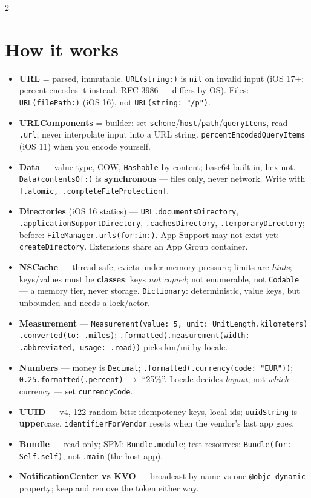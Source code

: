 \documentclass[8pt]{extarticle}
\begin{document}
\begin{multicols}{2}
\raggedright

\section{How it works}
\begin{itemize}
  \item \textbf{URL} = parsed, immutable. \texttt{URL(string:)} is \texttt{nil} on invalid
        input (iOS 17+: percent-encodes it instead, RFC 3986 — differs by OS). Files:
        \texttt{URL(filePath:)} (iOS 16), not \texttt{URL(string: "/p")}.
  \item \textbf{URLComponents} = builder: set \texttt{scheme}/\texttt{host}/\texttt{path}/\texttt{queryItems},
        read \texttt{.url}; never interpolate input into a URL string.
        \texttt{percentEncodedQueryItems} (iOS 11) when you encode yourself.
  \item \textbf{Data} — value type, COW, \texttt{Hashable} by content; base64 built in, hex
        not. \texttt{Data(contentsOf:)} is \textbf{synchronous} — files only, never network.
        Write with \texttt{[.atomic, .completeFileProtection]}.
  \item \textbf{Directories} (iOS 16 statics) — \texttt{URL.documentsDirectory},
        \texttt{.applicationSupportDirectory}, \texttt{.cachesDirectory},
        \texttt{.temporaryDirectory}; before: \texttt{FileManager.urls(for:in:)}.
        App Support may not exist yet: \texttt{createDirectory}. Extensions share an App
        Group container.
  \item \textbf{NSCache} — thread-safe; evicts under memory pressure; limits are
        \emph{hints}; keys/values must be \textbf{classes}; keys \emph{not copied}; not
        enumerable, not \texttt{Codable} — a memory tier, never storage. \texttt{Dictionary}:
        deterministic, value keys, but unbounded and needs a lock/actor.
  \item \textbf{Measurement} — \texttt{Measurement(value: 5, unit: UnitLength.kilometers)}
        \texttt{.converted(to: .miles)}; \texttt{.formatted(.measurement(width:
        .abbreviated, usage: .road))} picks km/mi by locale.
  \item \textbf{Numbers} — money is \texttt{Decimal}; \texttt{.formatted(.currency(code:
        "EUR"))}; \texttt{0.25.formatted(.percent)} $\to$ ``25\%''. Locale decides
        \emph{layout}, not \emph{which} currency — set \texttt{currencyCode}.
  \item \textbf{UUID} — v4, 122 random bits: idempotency keys, local ids;
        \texttt{uuidString} is \textbf{upper}case. \texttt{identifierForVendor} resets when the
        vendor's last app goes.
  \item \textbf{Bundle} — read-only; SPM: \texttt{Bundle.module}; test resources:
        \texttt{Bundle(for: Self.self)}, not \texttt{.main} (the host app).
  \item \textbf{NotificationCenter vs KVO} — broadcast by name vs one \texttt{@objc
        dynamic} property; keep and remove the token either way.
\end{itemize}


\end{multicols}
\end{document}
